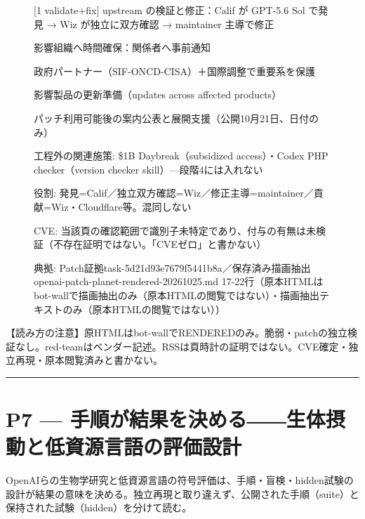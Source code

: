 \documentclass[lualatex,a4paper,10pt]{jlreq}
\begin{document}
\begin{figure}[htbp]\centering
\begin{tcolorbox}[colback=SurveySoft,colframe=SurveyAccent,arc=1mm,boxrule=0.4pt,left=2mm,right=2mm,title={協調開示の五段階（p6-f1、§6.1実物）}]
{\footnotesize 
[1 validate+fix] upstream の検証と修正：Calif が GPT-5.6 Sol で発見 → Wiz が独立に双方確認 → maintainer 主導で修正\par
[2 advance-notice] 影響組織へ時間確保：関係者へ事前通知\par
[3 coordination] 政府パートナー（SIF-ONCD-CISA）＋国際調整で重要系を保護\par
[4 prepare] 影響製品の更新準備（updates across affected products）\par
[5 publish] パッチ利用可能後の案内公表と展開支援（公開10月21日、日付のみ）\par
工程外の関連施策: \$1B Daybreak（subsidized access）・Codex PHP checker（version checker skill）—段階4には入れない\par
役割: 発見=Calif／独立双方確認=Wiz／修正主導=maintainer／貢献=Wiz・Cloudflare等。混同しない\par
CVE: 当該頁の確認範囲で識別子未特定であり、付与の有無は未検証（不存在証明ではない。「CVEゼロ」と書かない）\par
典拠: Patch証拠task-5d21d93e7679f5441b8a／保存済み描画抽出 openai-patch-planet-rendered-20261025.md 17-22行（原本HTMLはbot-wallで描画抽出のみ（原本HTMLの閲覧ではない）・描画抽出テキストのみ（原本HTMLの閲覧ではない））\par
\par}
\end{tcolorbox}
\end{figure}


\begin{tcolorbox}[colback=SurveySoft,colframe=SurveyRule,arc=1mm,boxrule=0.4pt,left=2mm,right=2mm]
【読み方の注意】原HTMLはbot-wallでRENDEREDのみ。脆弱・patchの独立検証なし。red-teamはベンダー記述。RSSは頁時計の証明ではない。CVE確定・独立再現・原本閲覧済みと書かない。

\end{tcolorbox}


\bigskip\hrule\bigskip


\section{P7 --- 手順が結果を決める――生体摂動と低資源言語の評価設計}
\label{sec:P7}


OpenAIらの生物学研究と低資源言語の符号評価は、手順・盲検・hidden試験の設計が結果の意味を決める。独立再現と取り違えず、公開された手順（suite）と保持された試験（hidden）を分けて読む。
\end{document}
